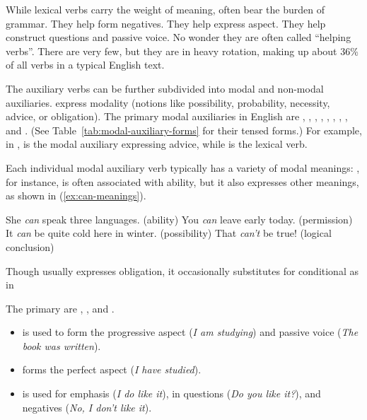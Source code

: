 While lexical verbs carry the weight of meaning,  often bear the burden of grammar. They help form negatives. They help express aspect. They help construct questions and passive voice. No wonder they are often called \enquote{helping verbs}. There are very few, but they are in heavy rotation, making up about 36\% of all verbs in a typical English text.

The auxiliary verbs can be further subdivided into modal and non-modal auxiliaries.  express modality (notions like possibility, probability, necessity, advice, or obligation). The primary modal auxiliaries in English are , , , , , , , , and . (See Table~\ref{tab:modal-auxiliary-forms} for their tensed forms.) For example, in ,  is the modal auxiliary expressing advice, while  is the lexical verb.

Each individual modal auxiliary verb typically has a variety of modal meanings: , for instance, is often associated with ability, but it also expresses other meanings, as shown in (\ref{ex:can-meanings}).

\ea \label{ex:can-meanings}
\ea She \emph{can} speak three languages. \hfill(ability)
\ex You \emph{can} leave early today. \hfill(permission)
\ex It \emph{can} be quite cold here in winter. \hfill(possibility)
\ex That \emph{can't} be true! \hfill(logical conclusion)
\z\z

Though  usually expresses obligation, it occasionally substitutes for conditional  as in 

The primary  are , , and .

\begin{itemize}[nosep]
    \item {} is used to form the progressive aspect (\textit{I \emph{am} studying}) and passive voice (\textit{The book \emph{was} written}).
    \item {} forms the perfect aspect (\textit{I \emph{have} studied}).
    \item {} is used for emphasis (\textit{I \emph{do} like it}), in questions (\textit{\emph{Do} you like it?}), and negatives (\textit{No, I \emph{don't} like it}).
\end{itemize}

